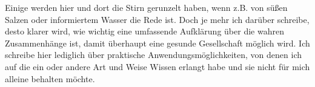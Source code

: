 \documentclass[a5paper,8pt]{scrbook}
\begin{document}
Einige werden hier und dort die Stirn gerunzelt haben, wenn z.B. von süßen Salzen oder informiertem Wasser die Rede ist. Doch je mehr ich darüber schreibe, desto klarer wird, wie wichtig eine umfassende Aufklärung über die wahren Zusammenhänge ist, damit überhaupt eine gesunde Gesellschaft möglich wird. Ich schreibe hier lediglich über praktische Anwendungsmöglichkeiten, von denen ich auf die ein oder andere Art und Weise Wissen erlangt habe und sie nicht für mich alleine behalten möchte.

\newpage
\end{document}

